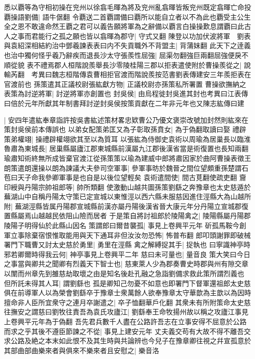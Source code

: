 悉以覇等為守相初操在兖州以徐翕毛暉為將及兖州亂翕暉皆叛兖州既定翕暉亡命投覇操語劉備|{
	語牛倨翻}
令覇送二首覇謂備曰覇所以能自立者以不為此也覇受主公生全之恩不敢違命然王覇之君可以義告願將軍為之辭備以覇言白操操歎息謂覇曰此古人之事而君能行之孤之願也皆以翕暉為郡守|{
	守式又翻}
陳登以功加伏波將軍　劉表與袁紹深相結約治中鄧羲諫表表曰内不失貢職外不背盟主|{
	背蒲妺翻}
此天下之逹義也治中獨何怪乎羲乃辭疾而退長沙太守張羨性屈強|{
	屈渠勿翻強巨兩翻屈強便戾不順從貌}
表不禮焉郡人桓階說羨舉長沙零陵桂陽三郡以拒表遣使附於曹操羨從之|{
	說輸芮翻　考異曰魏志桓階傳袁曹相拒官渡而階說羨按范書劉表傳建安三年羨拒表在官渡前也}
孫策遣其正議校尉張紘獻方物|{
	正議校尉亦孫策私所署置}
曹操欲撫納之表策為討逆將軍|{
	討逆將軍亦創置也}
封吳侯|{
	由烏程徙封吳進其封也考異曰江表傳曰倍於元年所獻其年制書拜討逆封吳侯按策貢獻在二年非元年也又陳志紘傳曰建}


|{
	安四年遣紘奉章詣許按吳書紘述策材畧忠欵曹公乃優文褒崇改號加封然則紘來在策封吳侯前本傳誤也}
以弟女配策弟匡又為子彰取孫賁女|{
	為于偽翻取讀曰娶}
禮辟策弟權翊|{
	操禮辟權翊欲其至以為質耳}
以張紘為侍御史袁術以周瑜為居巢長以臨淮魯肅為東城長|{
	居巢縣屬廬江郡東城縣前漢屬九江郡後漢省當是術復置也長知兩翻}
瑜肅知術終無所成皆棄官渡江從孫策策以瑜為建威中郎將肅因家於曲阿曹操表徵王朗策遣朗還操以朗為諫議大夫參司空軍事|{
	參軍事昉於魏晉之間位望頗重孫楚謂石苞曰天子命我參卿軍事是也自是以後位望輕矣}
袁術遣間使|{
	間古莧翻使疏吏翻}
齎印綬與丹陽宗帥祖郎等|{
	帥所類翻}
使激動山越共圖孫策劉繇之奔豫章也太史慈遁於蕪湖山中自稱丹陽太守策已定宣城以東惟涇以西六縣未服慈因進住涇縣大為山越所附|{
	蕪湖涇縣皆属丹陽郡宣城縣前漢亦屬丹陽後漢省晉大康元年分丹陽立宣城郡復置縣屬焉山越越民依阻山險而居者}
于是策自將討祖郎於陵陽禽之|{
	陵陽縣屬丹陽郡陵陽子明得仙於此縣山因名}
策謂郎曰爾昔襲孤|{
	事見上卷興平元年}
斫孤馬鞍今創軍立事除棄宿恨惟取能用與天下通耳非但汝汝勿恐怖|{
	怖普布翻}
郎叩頭謝罪即破械署門下職曹又討太史慈於勇里|{
	勇里在涇縣}
禽之解縛捉其手|{
	捉執也}
曰寧識神亭時邪若卿爾時得我云何|{
	神亭事見上卷興平二年}
慈曰未可量也|{
	量音良}
策大笑曰今日之事當與卿共之聞卿有烈義天下智士也|{
	慈東萊人少為郡奏曹史時郡與州有隙交章以闈而州章先到雒慈劫取壞之由是知名後赴孔融之急詣劉備求救此策所謂烈義也}
但所託未得其人耳|{
	謂劉繇也}
孤是卿知己勿憂不如意也即署門下督軍還祖郎太史慈俱在前導軍人以為榮會劉繇卒于豫章士衆萬餘人欲奉豫章太守華歆為主歆以為因時擅命非人臣所宜衆守之連月卒謝遣之|{
	卒子恤翻華戶化翻}
其衆未有所附策命太史慈往撫安之謂慈曰劉牧往責吾為袁氏攻廬江|{
	劉繇奉王命牧揚州故以稱之攻廬江事見上卷興平元年為于偽翻}
吾先君兵數千人盡在公路許吾志在立事安得不屈意於公路而求之乎其後不遵臣節諫之不從|{
	事見上建安元年}
丈夫義交苟有大故不得不離吾交求公路及絶之本末如此恨不及其生時與共論辨也今兒子在豫章卿往視之幷宣孤意於其部曲部曲樂來者與俱來不樂來者且安慰之|{
	樂音洛}
